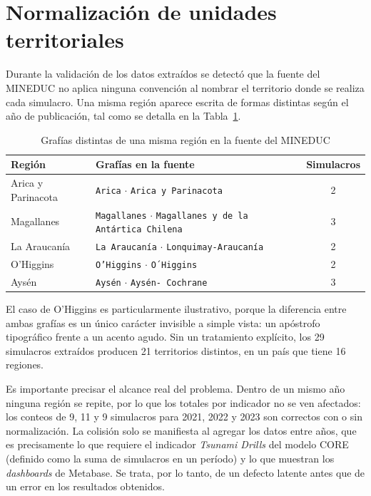 \documentclass[12pt,letterpaper,oneside]{report}
\begin{document}
\section{Normalizaci\'on de unidades territoriales}
\label{sec:normalizacion}

Durante la validaci\'on de los datos extra\'idos se detect\'o que la fuente del MINEDUC no aplica ninguna convenci\'on al nombrar el territorio donde se realiza cada simulacro. Una misma regi\'on aparece escrita de formas distintas seg\'un el a\~no de publicaci\'on, tal como se detalla en la Tabla~\ref{tab:grafias}.

\begin{table}[H]
\centering
\caption{Graf\'ias distintas de una misma regi\'on en la fuente del MINEDUC}
\label{tab:grafias}
\begin{tabular}{|p{4cm}|p{6.5cm}|c|}
\hline
\textbf{Regi\'on} & \textbf{Graf\'ias en la fuente} & \textbf{Simulacros} \\
\hline
Arica y Parinacota & \texttt{Arica} $\cdot$ \texttt{Arica y Parinacota} & 2 \\
\hline
Magallanes & \texttt{Magallanes} $\cdot$ \texttt{Magallanes y de la Ant\'artica Chilena} & 3 \\
\hline
La Araucan\'ia & \texttt{La Araucan\'ia} $\cdot$ \texttt{Lonquimay-Araucan\'ia} & 2 \\
\hline
O'Higgins & \texttt{O'Higgins} $\cdot$ \texttt{O´Higgins} & 2 \\
\hline
Ays\'en & \texttt{Ays\'en} $\cdot$ \texttt{Ays\'en- Cochrane} & 3 \\
\hline
\end{tabular}
\end{table}

El caso de O'Higgins es particularmente ilustrativo, porque la diferencia entre ambas graf\'ias es un \'unico car\'acter invisible a simple vista: un ap\'ostrofo tipogr\'afico frente a un acento agudo. Sin un tratamiento expl\'icito, los 29 simulacros extra\'idos producen 21 territorios distintos, en un pa\'is que tiene 16 regiones.

Es importante precisar el alcance real del problema. Dentro de un mismo a\~no ninguna regi\'on se repite, por lo que los totales por indicador no se ven afectados: los conteos de 9, 11 y 9 simulacros para 2021, 2022 y 2023 son correctos con o sin normalizaci\'on. La colisi\'on solo se manifiesta al agregar los datos entre a\~nos, que es precisamente lo que requiere el indicador \textit{Tsunami Drills} del modelo CORE (definido como la suma de simulacros en un per\'iodo) y lo que muestran los \textit{dashboards} de Metabase. Se trata, por lo tanto, de un defecto latente antes que de un error en los resultados obtenidos.
\end{document}
